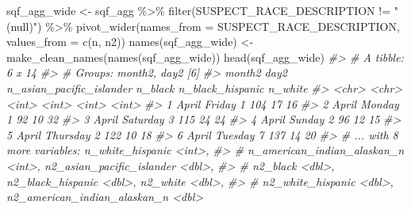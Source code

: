 \documentclass[
]{krantz}
\makeatletter
\newenvironment{Shaded}{\begin{snugshade}}{\end{snugshade}}
\newcommand{\AttributeTok}[1]{\textcolor[rgb]{0.61,0.61,0.61}{#1}}
\newcommand{\CommentTok}[1]{\textcolor[rgb]{0.37,0.37,0.37}{\textit{#1}}}
\newcommand{\FunctionTok}[1]{\textcolor[rgb]{0,0,0}{#1}}
\newcommand{\NormalTok}[1]{#1}
\newcommand{\OtherTok}[1]{\textcolor[rgb]{0.37,0.37,0.37}{#1}}
\newcommand{\SpecialCharTok}[1]{\textcolor[rgb]{0,0,0}{#1}}
\newcommand{\StringTok}[1]{\textcolor[rgb]{0.5,0.5,0.5}{#1}}
\newenvironment{kframe}{%
\medskip{}
\setlength{\fboxsep}{.8em}
 \def\at@end@of@kframe{}%
 \ifinner\ifhmode%
  \def\at@end@of@kframe{\end{minipage}}%
  \begin{minipage}{\columnwidth}%
 \fi\fi%
 \def\FrameCommand##1{\hskip\@totalleftmargin \hskip-\fboxsep
 \colorbox{shadecolor}{##1}\hskip-\fboxsep
     \hskip-\linewidth \hskip-\@totalleftmargin \hskip\columnwidth}%
 \MakeFramed {\advance\hsize-\width
   \@totalleftmargin\z@ \linewidth\hsize
   \@setminipage}}%
 {\par\unskip\endMakeFramed%
 \at@end@of@kframe}
\renewenvironment{Shaded}{\begin{kframe}}{\end{kframe}}
\makeatother
\begin{document}
\begin{Shaded}
\begin{Highlighting}[]
\NormalTok{sqf\_agg\_wide }\OtherTok{\textless{}{-}}\NormalTok{ sqf\_agg }\SpecialCharTok{\%\textgreater{}\%}
  \FunctionTok{filter}\NormalTok{(SUSPECT\_RACE\_DESCRIPTION }\SpecialCharTok{!=} \StringTok{"(null)"}\NormalTok{) }\SpecialCharTok{\%\textgreater{}\%}
  \FunctionTok{pivot\_wider}\NormalTok{(}\AttributeTok{names\_from =}\NormalTok{ SUSPECT\_RACE\_DESCRIPTION, }\AttributeTok{values\_from =} \FunctionTok{c}\NormalTok{(n, n2)) }
\FunctionTok{names}\NormalTok{(sqf\_agg\_wide) }\OtherTok{\textless{}{-}} \FunctionTok{make\_clean\_names}\NormalTok{(}\FunctionTok{names}\NormalTok{(sqf\_agg\_wide))}
\FunctionTok{head}\NormalTok{(sqf\_agg\_wide)}
\CommentTok{\#\textgreater{} \# A tibble: 6 x 14}
\CommentTok{\#\textgreater{} \# Groups:   month2, day2 [6]}
\CommentTok{\#\textgreater{}   month2 day2     n\_asian\_pacific\_islander n\_black n\_black\_hispanic n\_white}
\CommentTok{\#\textgreater{}   \textless{}chr\textgreater{}  \textless{}chr\textgreater{}                       \textless{}int\textgreater{}   \textless{}int\textgreater{}            \textless{}int\textgreater{}   \textless{}int\textgreater{}}
\CommentTok{\#\textgreater{} 1 April  Friday                          1     104               17      16}
\CommentTok{\#\textgreater{} 2 April  Monday                          1      92               10      32}
\CommentTok{\#\textgreater{} 3 April  Saturday                        3     115               24      24}
\CommentTok{\#\textgreater{} 4 April  Sunday                          2      96               12      15}
\CommentTok{\#\textgreater{} 5 April  Thursday                        2     122               10      18}
\CommentTok{\#\textgreater{} 6 April  Tuesday                         7     137               14      20}
\CommentTok{\#\textgreater{} \# ... with 8 more variables: n\_white\_hispanic \textless{}int\textgreater{},}
\CommentTok{\#\textgreater{} \#   n\_american\_indian\_alaskan\_n \textless{}int\textgreater{}, n2\_asian\_pacific\_islander \textless{}dbl\textgreater{},}
\CommentTok{\#\textgreater{} \#   n2\_black \textless{}dbl\textgreater{}, n2\_black\_hispanic \textless{}dbl\textgreater{}, n2\_white \textless{}dbl\textgreater{},}
\CommentTok{\#\textgreater{} \#   n2\_white\_hispanic \textless{}dbl\textgreater{}, n2\_american\_indian\_alaskan\_n \textless{}dbl\textgreater{}}
\end{Highlighting}
\end{Shaded}
\end{document}
